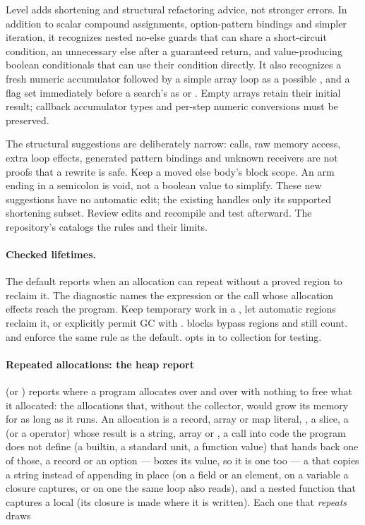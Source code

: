 Level  adds shortening and structural refactoring advice, not stronger
errors. In addition to scalar compound assignments, option-pattern bindings and
simpler iteration, it recognizes nested no-else guards that can share a
short-circuit condition, an unnecessary else after a guaranteed return, and
value-producing boolean conditionals that can use their condition directly.
It also recognizes a fresh numeric accumulator followed by a simple array loop
as a possible , and a flag set immediately before a search's
 as  or . Empty arrays retain their initial result;
callback accumulator types and per-step numeric conversions must be preserved.

The structural suggestions are deliberately narrow: calls, raw memory access,
extra loop effects, generated pattern bindings and unknown receivers are not
proofs that a rewrite is safe. Keep a moved else body's block scope. An arm
ending in a semicolon is void, not a boolean value to simplify. These new
suggestions have no automatic edit; the existing  handles only its
supported shortening subset. Review edits and recompile and test afterward.
The repository's  catalogs the rules and their limits.

\paragraph{Checked lifetimes.}

The default  reports 
when an allocation can repeat without a proved region to reclaim it.
The diagnostic names the expression or the call whose allocation effects
reach the program. Keep temporary work in a , let automatic
regions reclaim it, or explicitly permit GC with .
 blocks bypass regions and still count.  and
 enforce the same rule as the default.  opts in
to collection for testing.

\paragraph{Repeated allocations: the heap report}
\label{sec:strictheap}

 (or ) reports where a program allocates over and over with
nothing to free what it allocated: the allocations that, without the
collector, would grow its memory for as long as it runs. An allocation is a
record, array or map literal, \ic{[v; n]}, a slice, a \ic{+} (or a
 operator) whose result is a string, array or , a
call into code the program does not define (a builtin, a standard unit, a
function value) that hands back one of those, a record or an option ---
 boxes its value, so it is one too --- a \ic{+=} that copies a
string instead of appending in place (on a field or an element, on a variable
a closure captures, or on one the same loop also reads), and a nested function that
captures a local (its closure is made where it is written). Each one that
\emph{repeats} draws


